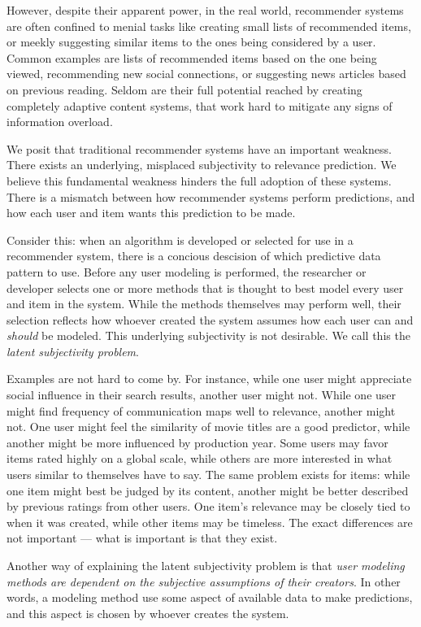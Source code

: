 However, despite their apparent power, in the real world, recommender systems are often confined
to menial tasks like creating small lists of recommended items, 
or meekly suggesting similar items to the ones being considered by a user.
Common examples are lists of recommended items based on the one being viewed, 
recommending new social connections, or suggesting news articles based on previous reading.
Seldom are their full potential reached by creating completely adaptive
content systems, that work hard to mitigate any signs of information overload.

We posit that traditional recommender systems have an important weakness.
There exists an underlying, misplaced subjectivity to relevance prediction.
We believe this fundamental weakness hinders the full adoption of these systems.
There is a mismatch between how recommender systems perform predictions,
and how each user and item wants this prediction to be made.

Consider this: 
when an algorithm is developed or selected for use in a recommender system,
there is a concious descision of which predictive data pattern to use.
Before any user modeling is performed, the researcher or developer selects
one or more methods that is thought to best model every user and item in the system.
While the methods themselves may perform well, their selection
reflects how whoever created the system assumes how each user
can and \emph{should} be modeled. This underlying subjectivity is not desirable.
We call this the \emph{latent subjectivity problem}.

Examples are not hard to come by.
For instance, while one user might appreciate social
influence in their search results, another user might not.
While one user might find frequency of communication maps well to relevance,
another might not. 
One user might feel the similarity of movie titles are a good predictor,
while another might be more influenced by production year.
Some users may favor items rated highly on a global scale,
while others are more interested in what users similar to themselves have to say.
The same problem exists for items: while one item might best be judged by its content,
another might be better described by previous ratings from other users.
One item's relevance may be closely tied to when it was created,
while other items may be timeless.
The exact differences are not important --- what is important is that they exist.

Another way of explaining the latent subjectivity problem is that 
\emph{user modeling methods are dependent on the subjective assumptions of their creators}.
In other words, a modeling method use some aspect of available data to make predictions,
and this aspect is chosen by whoever creates the system.

